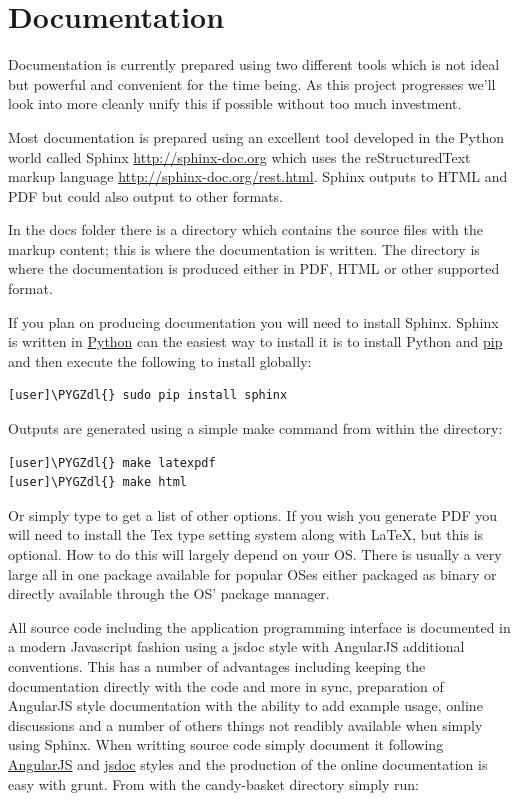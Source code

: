 \documentclass[letterpaper,10pt,english]{sphinxmanual}
\def\PYGZdl{\char`\$}
\begin{document}
\section{Documentation}
\label{developer-guide:documentation}
Documentation is currently prepared using two different tools which is
not ideal but powerful and convenient for the time being. As this
project progresses we'll look into more cleanly unify this if possible
without too much investment.

Most documentation is prepared using an excellent tool developed in
the Python world called Sphinx \href{http://sphinx-doc.org}{http://sphinx-doc.org} which uses the reStructuredText markup
language \href{http://sphinx-doc.org/rest.html}{http://sphinx-doc.org/rest.html}. Sphinx outputs to HTML and PDF
but could also output to other formats.

In the docs folder there is a  directory which contains the
source files with the markup content; this is where the documentation
is written. The  directory is where the documentation is
produced either in PDF, HTML or other supported format.

If you plan on producing documentation you will need to install
Sphinx. Sphinx is written in \href{https://www.python.org/}{Python} can
the easiest way to install it is to install Python and \href{https://github.com/pypa/pip}{pip} and then execute the following to
install globally:

\begin{Verbatim}[commandchars=\\\{\}]
[user]\PYGZdl{} sudo pip install sphinx
\end{Verbatim}

Outputs are generated using a simple make command from within the
 directory:

\begin{Verbatim}[commandchars=\\\{\}]
[user]\PYGZdl{} make latexpdf
[user]\PYGZdl{} make html
\end{Verbatim}

Or simply type  to get a list of other options. If you wish
you generate PDF you will need to install the Tex type setting system
along with LaTeX, but this is optional. How to do this will largely
depend on your OS. There is usually a very large all in one package
available for popular OSes either packaged as binary or directly
available through the OS' package manager.

All source code including the application programming interface is
documented in a modern Javascript fashion using a jsdoc style with
AngularJS additional conventions. This has a number of advantages
including keeping the documentation directly with the code and more in
sync, preparation of AngularJS style documentation with the ability to
add example usage, online discussions and a number of others things
not readibly available when simply using Sphinx. When writting source
code simply document it following \href{https://github.com/angular/angular.js}{AngularJS} and \href{http://usejsdoc.org/}{jsdoc} styles and the production of the online
documentation is easy with grunt. From with the candy-basket directory
simply run:
\end{document}
